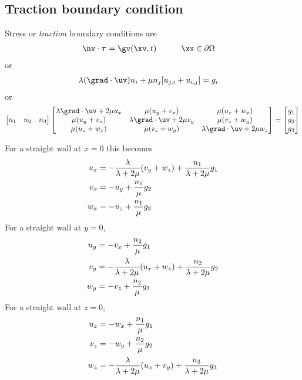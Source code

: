 \documentclass[11pt]{article}
\newcommand{\tauv}{\boldsymbol{\tau}}
\begin{document}
\subsection{Traction boundary condition}
Stress or {\em traction} boundary conditions are
\begin{alignat}{2}
  \nv\cdot\tauv &= \gv(\xv,t) &&\qquad \xv\in\partial\Omega
\end{alignat}
or
\begin{align}
   \lambda (\grad\cdot\uv) n_i + \mu n_j[ u_{j,i} + u_{i,j} ] &= g_i 
\end{align}
or 
\begin{align}
  \begin{bmatrix} n_1 & n_2 & n_3 \end{bmatrix}
     \begin{bmatrix} 
        \lambda \grad\cdot\uv +2\mu u_x  & \mu(u_y+v_x) & \mu(u_z+w_x) \\
        \mu(u_y+v_x) &  \lambda \grad\cdot\uv +2\mu v_y  & \mu(v_z+w_y) \\
        \mu(u_z+w_x) & \mu(v_z+w_y) & \lambda \grad\cdot\uv +2\mu w_z   
     \end{bmatrix} 
   = 
     \begin{bmatrix} g_1 \\ g_2 \\ g_3 \end{bmatrix} \label{eq:tractionBC}
\end{align}

For a straight wall at $x=0$ this becomes
\begin{align}
   u_x &= - {\lambda\over \lambda+2\mu} (v_y + w_z) + {n_1 \over \lambda+2\mu} g_1 \\
   v_x &= - u_y + {n_1 \over \mu} g_2 \\
   w_x &= -u_z + {n_1 \over \mu} g_3
\end{align}
For a straight wall at $y=0$, 
\begin{align}
   u_y &= -v_x + {n_2 \over \mu} g_1 \\
   v_y &= - {\lambda\over \lambda+2\mu} (u_x + w_z)  + {n_2 \over \lambda+2\mu} g_2 \\
   w_y &= -v_z + {n_2 \over \mu} g_3
\end{align}
For a straight wall at $z=0$, 
\begin{align}
   u_z &= -w_x + {n_1 \over \mu} g_1 \\
   v_z &= -w_y + {n_2 \over \mu} g_2 \\
   w_z &= - {\lambda\over \lambda+2\mu} (u_x + v_y ) + {n_3 \over \lambda+2\mu} g_3
\end{align}
\end{document}
